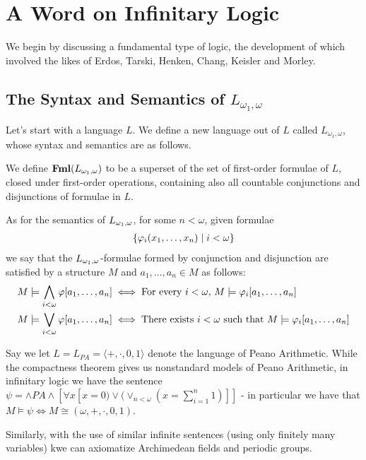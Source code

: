 \section{A Word on Infinitary Logic}

We begin by discussing a fundamental type of logic, the development of which involved the likes of Erdos, Tarski, Henken, Chang, Keisler and Morley.

\subsection{The Syntax and Semantics of $L_{\omega_1, \omega}$}

Let's start with a language $L$. We define a new language out of $L$ called $L_{\omega_1, \omega}$, whose syntax and semantics are as follows.

We define $\mathbf{Fml}\!\left( L_{\omega_1, \omega} \right)$ to be a superset of the set of first-order formulae of $L$, closed under first-order operations, containing also all countable conjunctions and disjunctions of formulae in $L$.

As for the semantics of $L_{\omega_1, \omega}$, for some $n < \omega$, given formulae
\begin{align*}
    \left\{ \varphi_{i}\!\left( x_1, \ldots, x_n \right) \; \middle\vert \; i < \omega \right\}
\end{align*}
we say that the $L_{\omega_1, \omega}$-formulae formed by conjunction and disjunction are satisfied by a structure $M$ and $a_1, \ldots, a_n \in M$ as follows:
\begin{align*}
    M \models \bigwedge_{i < \omega} \varphi\!\left[ a_1, \ldots, a_n \right] &\iff \text{For every } i < \omega \text{, } M \models \varphi_i\!\left[ a_1, \ldots, a_n \right] \\
    M \models \bigvee_{i < \omega} \varphi\!\left[ a_1, \ldots, a_n \right] &\iff \text{There exists } i < \omega \text{ such that } M \models \varphi_i\!\left[ a_1, \ldots, a_n \right]
\end{align*}

\begin{boxexample} Say we let $L=L_{PA}=\langle +, \cdot, 0, 1\rangle$ denote the language of Peano Arithmetic. While the compactness theorem gives us nonstandard models of Peano Arithmetic, in infinitary logic we have the sentence $\psi=\wedge PA \wedge [\forall x[x=0)\vee(\vee_{n<\omega}(x=\sum_{i=1}^n 1)]]$ - in particular we have that $M\models \psi \Leftrightarrow M\cong (\omega, +, \cdot, 0, 1)$.

Similarly, with the use of similar infinite sentences (using only finitely many variables) kwe can axiomatize Archimedean fields and periodic groups.
\end{boxexample}


